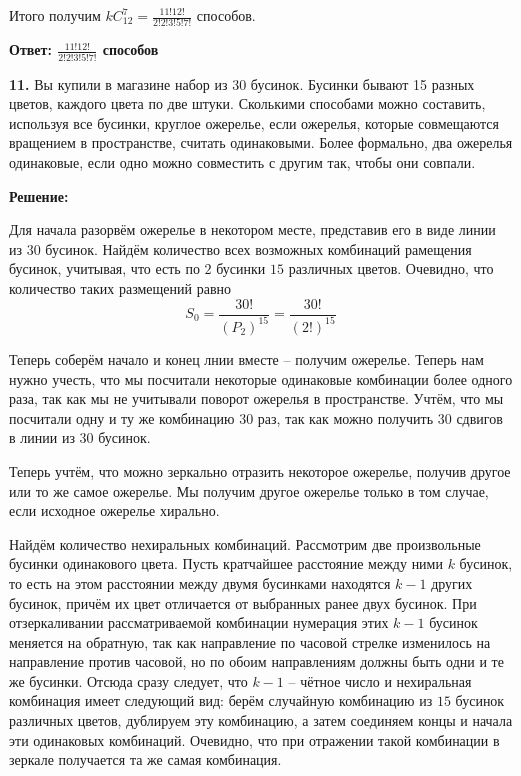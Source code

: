 \documentclass[a4paper,12pt]{article} %
\begin{document}
Итого получим $kC^7_{12} = \frac{11!12!}{2!2!3!5!7!}$ способов.

\begin{flushright}
\begin{large}
\textbf {Ответ:  $\frac{11!12!}{2!2!3!5!7!}$ способов}
\end{large}
\end{flushright}


{\bf 11.} Вы купили в магазине набор из 30 бусинок. Бусинки бывают 15 разных цветов, каждого цвета по две штуки. Сколькими способами можно составить, используя все бусинки, круглое ожерелье, если ожерелья, которые совмещаются вращением в пространстве, считать
одинаковыми. Более формально, два ожерелья одинаковые, если одно
можно совместить с другим так, чтобы они совпали.
\newpage
\begin{center}
\bfseries
{\Large Решение: }
\end{center}

Для начала разорвём ожерелье в некотором месте, представив его в виде линии из $30$ бусинок. Найдём количество всех возможных комбинаций рамещения бусинок, учитывая, что есть по $2$ бусинки $15$ различных цветов. Очевидно, что количество таких размещений равно
\[S_0 = \frac{30!}{(P_2)^{15}} = \frac{30!}{(2!)^{15}}\]

Теперь соберём начало и конец лнии вместе -- получим ожерелье. Теперь нам нужно учесть, что мы посчитали некоторые одинаковые комбинации более одного раза, так как мы не учитывали поворот ожерелья в пространстве. Учтём, что мы посчитали одну и ту же комбинацию $30$ раз, так как можно получить $30$ сдвигов в линии из $30$ бусинок.

Теперь учтём, что можно зеркально отразить некоторое ожерелье, получив другое или то же самое ожерелье. Мы получим другое ожерелье только в том случае, если исходное ожерелье хирально.

Найдём количество нехиральных комбинаций. Рассмотрим две произвольные бусинки одинакового цвета. Пусть кратчайшее расстояние между ними $k$ бусинок, то есть на этом расстоянии между двумя бусинками находятся $k-1$ других бусинок, причём их цвет отличается от выбранных ранее двух бусинок. При отзеркаливании рассматриваемой комбинации нумерация этих $k-1$ бусинок меняется на обратную, так как направление по часовой стрелке изменилось на направление против часовой, но по обоим направлениям должны быть одни и те же бусинки. Отсюда сразу следует, что $k-1$ -- чётное число и нехиральная комбинация имеет следующий вид: берём случайную комбинацию из $15$ бусинок различных цветов, дублируем эту комбинацию, а затем соединяем концы и начала эти одинаковых комбинаций. Очевидно, что при отражении такой комбинации в зеркале получается та же самая комбинация.
\end{document}
